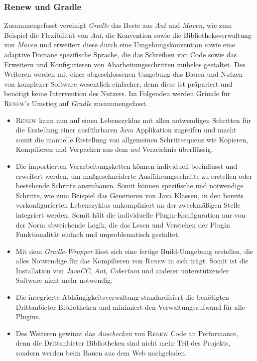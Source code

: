 		\subsubsection{Renew und Gradle}
		Zusammengefasst vereinigt \textit{Gradle} das Beste aus \textit{Ant} und \textit{Maven}, wie zum Beispiel die Flexibilität von \textit{Ant}, die Konvention sowie die Bibliotheksverwaltung von \textit{Maven} und erweitert diese durch eine Umgebungskonvention sowie eine adaptive Domäne spezifische Sprache, die das Schreiben von Code sowie das Erweitern und Konfigurieren von Abarbeitungsschritten mühelos gestaltet. Des Weiteren werden mit einer abgeschlossenen Umgebung das Bauen und Nutzen von komplexer Software wesentlich einfacher, denn diese ist präpariert und benötigt keine Intervention des Nutzers. \newline
		Im Folgenden werden Gründe für \textsc{Renew}'s Umstieg auf \textit{Gradle} zusammengefasst.\bigbreak
		\begin{itemize}
			\item \textsc{Renew} kann nun auf einen Lebenszyklus mit allen notwendigen Schritten für die Erstellung einer ausführbaren Java Applikation zugreifen und macht somit die manuelle Erstellung von allgemeinen Schrittsequenz wie Kopieren, Kompilieren und Verpacken aus dem \textit{ant} Verzeichnis überflüssig. 
			\item Die importierten Verarbeitungsketten können individuell beeinflusst und erweitert werden, um maßgeschneiderte Ausführungsschritte zu erstellen oder bestehende Schritte auszubauen. Somit können spezifische und notwendige Schritte, wie zum Beispiel das Generieren von Java Klassen, in den bereits vorkonfigurierten Lebenszyklus unkompliziert an der zweckmäßigen Stelle integriert werden. Somit hält die individuelle Plugin-Konfiguration nur von der Norm abweichende Logik, die das Lesen und Verstehen der Plugin Funktionalität einfach und unproblematisch gestaltet. 
			\item Mit dem \textit{Gradle-Wrapper} lässt sich eine fertige Build-Umgebung erstellen, die alles Notwendige für das Kompilieren von \textsc{Renew} in sich trägt. Somit ist die Installation von \textit{JavaCC}, \textit{Ant}, \textit{Cobertura} und anderer unterstützender Software nicht mehr notwendig.
			\item Die integrierte Abhängigkeitsverwaltung standardisiert die benötigten Drittanbieter Bibliotheken und minimiert den Verwaltungsaufwand für alle Plugins. 
			\item Des Weiteren gewinnt das \textit{Auschecken} von \textsc{Renew} Code an Performance, denn die Drittanbieter Bibliotheken sind nicht mehr Teil des Projekts, sondern werden beim Bauen aus dem Web nachgeladen.
		\end{itemize}
